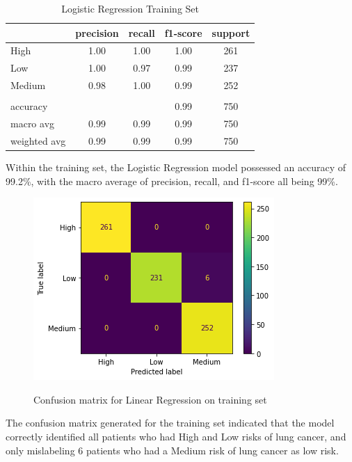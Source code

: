 \documentclass[runningheads]{llncs}
\begin{document}
\begin{table}[ht]
\centering
\caption{Logistic Regression Training Set}
\begin{tabular}{|l|c|c|c|c|} \hline
 & precision & recall & f1-score & support \\ \hline
High   & 1.00 & 1.00 & 1.00 & 261 \\ \hline
Low    & 1.00 & 0.97 & 0.99 & 237 \\ \hline
Medium & 0.98 & 1.00 & 0.99 & 252 \\ \hline
& & & & \\ \hline
accuracy     & & & 0.99 & 750 \\ \hline
macro avg    & 0.99 & 0.99 & 0.99 & 750 \\ \hline
weighted avg & 0.99 & 0.99 & 0.99 & 750 \\ \hline
\end{tabular}
\label{tab:regression-training}
\end{table}

Within the training set, the Logistic Regression model possessed an accuracy of 99.2\%, with the macro average of precision, recall, and f1-score all being 99\%. 

\begin{figure}[ht]           	 
\centering               	 
\caption{Confusion matrix for Linear Regression on training set}
\includegraphics[scale=0.5]{regression-CM-training.png}  	 
\label{fig:regression-CM-training}
\end{figure}

The confusion matrix generated for the training set indicated that the model correctly identified all patients who had High and Low risks of lung cancer, and only mislabeling 6 patients who had a Medium risk of lung cancer as low risk.
\newpage
\end{document}
